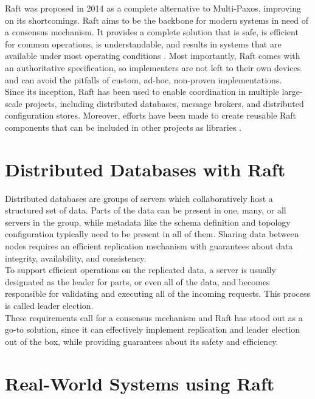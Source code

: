 Raft was proposed in 2014 \cite{raft} as a complete alternative to Multi-Paxos, improving on its shortcomings. Raft aims to be the backbone for modern systems in need of a consensus mechanism. It provides a complete solution that is safe, is efficient for common operations, is understandable, and results in systems that are available under most operating conditions \cite{raft}. Most importantly, Raft comes with an authoritative specification, so implementers are not left to their own devices and can avoid the pitfalls of custom, ad-hoc, non-proven implementations.\\

Since its inception, Raft has been used to enable coordination in multiple large-scale projects, including distributed databases, message brokers, and distributed configuration stores. Moreover, efforts have been made to create reusable Raft components that can be included in other projects as libraries \cite{ratis}.

\section{Distributed Databases with Raft}

Distributed databases are groups of servers which collaboratively host a structured set of data. Parts of the data can be present in one, many, or all servers in the group, while metadata like the schema definition and topology configuration typically need to be present in all of them. Sharing data between nodes requires an efficient replication mechanism with guarantees about data integrity, availability, and consistency. \\

To support efficient operations on the replicated data, a server is usually designated as the leader for parts, or even all of the data, and becomes responsible for validating and executing all of the incoming requests. This process is called leader election.\\

These requirements call for a consensus mechanism and Raft has stood out as a go-to solution, since it can effectively implement replication and leader election out of the box, while providing guarantees about its safety and efficiency.

\section{Real-World Systems using Raft}

